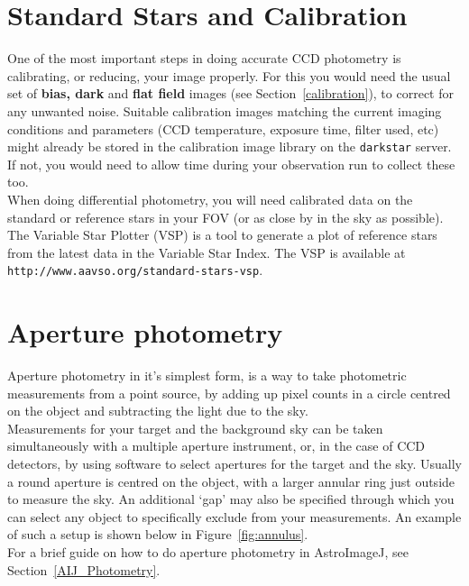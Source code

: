 \documentclass[12pt,twoside,a4paper]{report}
\begin{document}
\section{Standard Stars and Calibration}

One of the most important steps in doing accurate CCD photometry is calibrating, or reducing, your image properly. For this you would need the usual set of \textbf{bias, dark} and \textbf{flat field} images (see Section~\ref{calibration}), to correct for any unwanted noise. Suitable calibration images matching the current imaging conditions and parameters (CCD temperature, exposure time, filter used, etc) might already be stored in the calibration image library on the {\tt darkstar} server. If not, you would need to allow time during your observation run to collect these too.\\

When doing differential photometry, you will need calibrated data on the standard or reference stars in your FOV (or as close by in the sky as possible). The Variable Star Plotter (VSP) is a tool to generate a plot of reference stars from the latest data in the Variable Star Index. The VSP is available at {\tt http://www.aavso.org/standard-stars-vsp}.



\section{Aperture photometry}

Aperture photometry in it's simplest form, is a way to take photometric measurements from a point source, by adding up pixel counts in a circle centred on the object and subtracting the light due to the sky. \\


Measurements for your target and the background sky can be taken simultaneously with a multiple aperture instrument, or, in the case of CCD detectors, by using software to select apertures for the target and the sky. Usually a round aperture is centred on the object, with a larger annular ring just outside to measure the sky. An additional `gap' may also be specified through which you can select any object to specifically exclude from your measurements. An example of such a setup is shown below in Figure~\ref{fig:annulus}.\\

For a brief guide on how to do aperture photometry in AstroImageJ, see Section~\ref{AIJ_Photometry}.
\end{document}
